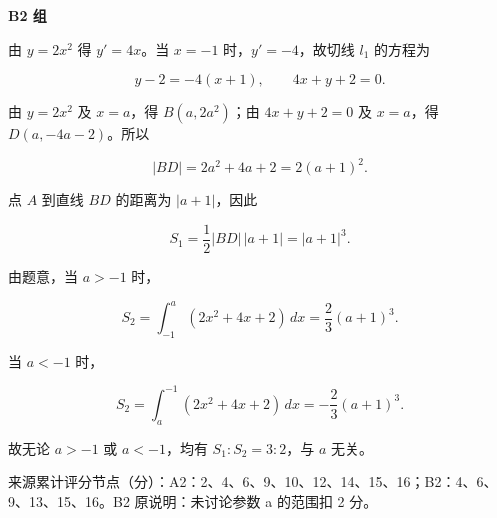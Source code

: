 \begin{answer}
\textbf{B2 组}


由 $y=2x^2$ 得 $y'=4x$。当 $x=-1$ 时，$y'=-4$，故切线 $l_1$ 的方程为

\nopagebreak[4]
\[
y-2=-4(x+1),\qquad 4x+y+2=0.
\]


由 $y=2x^2$ 及 $x=a$，得 $B(a,2a^2)$；由 $4x+y+2=0$ 及 $x=a$，得 $D(a,-4a-2)$。所以

\nopagebreak[4]
\[
|BD|=2a^2+4a+2=2(a+1)^2.
\]

点 $A$ 到直线 $BD$ 的距离为 $|a+1|$，因此

\nopagebreak[4]
\[
S_1=\dfrac12|BD|\,|a+1|=|a+1|^3.
\]


由题意，当 $a>-1$ 时，

\nopagebreak[4]
\[
S_2=\int_{-1}^{a}(2x^2+4x+2)\,dx
=\dfrac23(a+1)^3.
\]

当 $a<-1$ 时，

\nopagebreak[4]
\[
S_2=\int_a^{-1}(2x^2+4x+2)\,dx
=-\dfrac23(a+1)^3.
\]

故无论 $a>-1$ 或 $a<-1$，均有 $S_1:S_2=3:2$，与 $a$ 无关。

来源累计评分节点（分）：A2：2、4、6、9、10、12、14、15、16；B2：4、6、9、13、15、16。B2 原说明：未讨论参数 a 的范围扣 2 分。




\end{answer}

